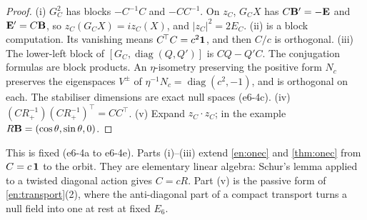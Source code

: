 \begin{proof}
(i) $G_C^2$ has blocks $-C^{-1}C$ and $-CC^{-1}$. On $z_C$, $G_CX$ has $C\mathbf B'=-\mathbf E$ and $\mathbf E'=C\mathbf B$, so $z_C(G_CX)=iz_C(X)$, and $|z_C|^2=2E_C$. (ii) is a
block computation. Its vanishing means $C^{\!\top}C=c^2\mathbf 1$, and then $C/c$ is orthogonal. (iii) The lower-left block of $[G_C,\operatorname{diag}(Q,Q')]$ is
$CQ-Q'C$. The conjugation formulas are block products. An $\eta$-isometry preserving the positive form $N_c$ preserves the eigenspaces $V^\pm$ of
$\eta^{-1}N_c=\operatorname{diag}(c^2,-1)$, and is orthogonal on each. The stabiliser dimensions are exact null spaces (e6-4c). (iv)
$(CR_+^{-1})(CR_+^{-1})^{\!\top}=CC^{\!\top}$. (v) Expand $z_C\cdot z_C$; in the example $R\mathbf B=(\cos\theta,\sin\theta,0)$.
\end{proof}

This is fixed (e6-4a to e6-4e). Parts (i)--(iii) extend \cref{en:onec} and \cref{thm:onec} from $C=c\,\mathbf 1$ to the orbit. They are
elementary linear algebra: Schur's lemma applied to a twisted diagonal action gives $C=cR$. Part (v) is the passive form of \cref{en:transport}(2), where the anti-diagonal part of a compact transport turns a null field into one at rest at fixed $E_6$.

